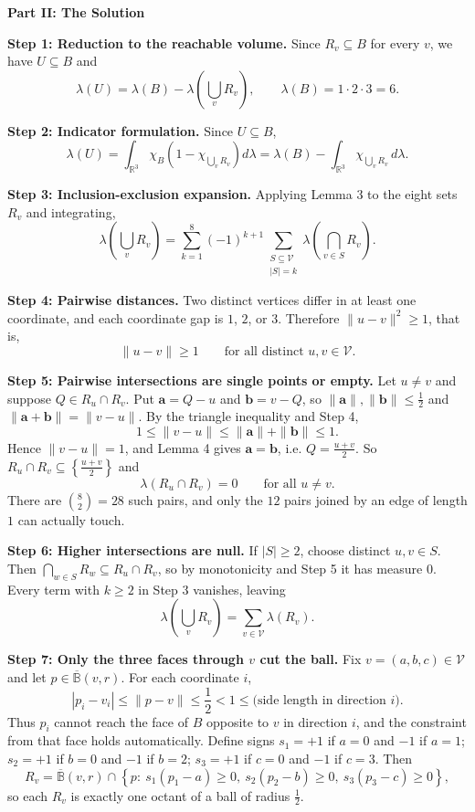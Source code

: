 \begin{enumerate}
 \textbf{Part II: The Solution}

 \textbf{Step 1: Reduction to the reachable volume.} Since $R_v\subseteq B$ for every $v$, we have $U\subseteq B$ and
 \[\lambda(U)=\lambda(B)-\lambda\left(\bigcup_{v}R_v\right),\qquad \lambda(B)=1\cdot2\cdot3=6.\]

 \textbf{Step 2: Indicator formulation.} Since $U\subseteq B$,
 \[\lambda(U)=\int_{\mathbb{R}^3}\chi_B\left(1-\chi_{\bigcup_v R_v}\right)d\lambda=\lambda(B)-\int_{\mathbb{R}^3}\chi_{\bigcup_v R_v}\,d\lambda.\]

 \textbf{Step 3: Inclusion-exclusion expansion.} Applying Lemma 3 to the eight sets $R_v$ and integrating,
 \[\lambda\left(\bigcup_vR_v\right)=\sum_{k=1}^{8}(-1)^{k+1}\sum_{\substack{S\subseteq\mathcal{V}\\|S|=k}}\lambda\left(\bigcap_{v\in S}R_v\right).\]

 \textbf{Step 4: Pairwise distances.} Two distinct vertices differ in at least one coordinate, and each coordinate gap is $1$, $2$, or $3$. Therefore $\|u-v\|^2\ge1$, that is,
 \[\|u-v\|\ge1\qquad\text{for all distinct }u,v\in\mathcal{V}.\]

 \textbf{Step 5: Pairwise intersections are single points or empty.} Let $u\ne v$ and suppose $Q\in R_u\cap R_v$. Put $\mathbf{a}=Q-u$ and $\mathbf{b}=v-Q$, so $\|\mathbf{a}\|,\|\mathbf{b}\|\le\frac12$ and $\|\mathbf{a}+\mathbf{b}\|=\|v-u\|$. By the triangle inequality and Step 4,
 \[1\le\|v-u\|\le\|\mathbf{a}\|+\|\mathbf{b}\|\le1.\]Hence $\|v-u\|=1$, and Lemma 4 gives $\mathbf{a}=\mathbf{b}$, i.e. $Q=\frac{u+v}{2}$. So $R_u\cap R_v\subseteq\left\{\frac{u+v}{2}\right\}$ and
 \[\lambda(R_u\cap R_v)=0\qquad\text{for all }u\ne v.\]There are $\binom82=28$ such pairs, and only the $12$ pairs joined by an edge of length $1$ can actually touch.

 \textbf{Step 6: Higher intersections are null.} If $|S|\ge2$, choose distinct $u,v\in S$. Then $\bigcap_{w\in S}R_w\subseteq R_u\cap R_v$, so by monotonicity and Step 5 it has measure $0$. Every term with $k\ge2$ in Step 3 vanishes, leaving
 \[\lambda\left(\bigcup_vR_v\right)=\sum_{v\in\mathcal{V}}\lambda(R_v).\]

 \textbf{Step 7: Only the three faces through $v$ cut the ball.} Fix $v=(a,b,c)\in\mathcal{V}$ and let $p\in\overline{\mathbb{B}}(v,r)$. For each coordinate $i$,
 \[|p_i-v_i|\le\|p-v\|\le\frac12<1\le\text{(side length in direction }i).\]Thus $p_i$ cannot reach the face of $B$ opposite to $v$ in direction $i$, and the constraint from that face holds automatically. Define signs $s_1=+1$ if $a=0$ and $-1$ if $a=1$; $s_2=+1$ if $b=0$ and $-1$ if $b=2$; $s_3=+1$ if $c=0$ and $-1$ if $c=3$. Then
 \[R_v=\overline{\mathbb{B}}(v,r)\cap\left\{p:\ s_1(p_1-a)\ge0,\ s_2(p_2-b)\ge0,\ s_3(p_3-c)\ge0\right\},\]so each $R_v$ is exactly one octant of a ball of radius $\frac12$.


\end{enumerate}
